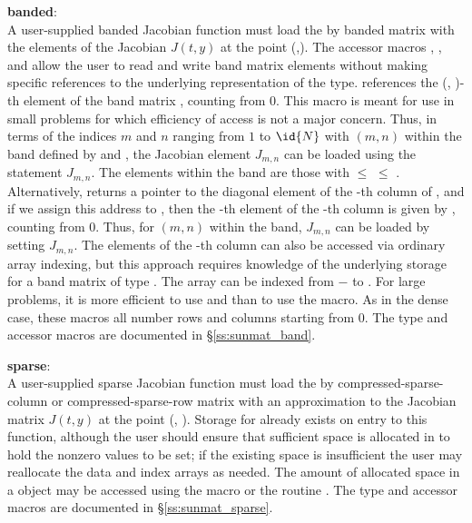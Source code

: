 {  {\bf banded}:\\
  A user-supplied banded Jacobian function must load the  by  banded matrix
   with the elements of the Jacobian $J(t,y)$ at the point
  (,).  The accessor macros ,
  , and  allow the user
  to read and write band matrix elements without making specific
  references to the underlying representation of the {\sunmatband}
  type.   references the (,
  )-th element of the band matrix , counting from $0$.
  This macro is meant for use in small problems for which efficiency
  of access is not a major concern.  Thus, in terms of the indices $m$
  and $n$ ranging from $1$ to $\id{N}$ with $(m,n)$ within the band defined
  by  and , the Jacobian element $J_{m,n}$ can
  be loaded using the statement 
  $J_{m,n}$. The elements within the band are those with 
  $\le$  $\le$ . Alternatively,
   returns a pointer to the diagonal element
  of the -th column of , and if we assign this address
  to , then the -th element of the
  -th column is given by
  , counting from $0$.  Thus,
  for $(m,n)$ within the band, $J_{m,n}$ can be loaded by setting
   $J_{m,n}$.  The
  elements of the -th column can also be accessed via ordinary
  array indexing, but this approach requires knowledge of the
  underlying storage for a band matrix of type {\sunmatband}.
  The array  can be indexed from $-$ to
  . For large problems, it is more efficient to use
   and  than to use the
   macro.  As in the dense case, these macros all
  number rows and columns starting from $0$.  The {\sunmatband} type
  and accessor macros are documented in \S\ref{ss:sunmat_band}.

  {\bf sparse}:\\
  A user-supplied sparse Jacobian function must load the  by 
  compressed-sparse-column or compressed-sparse-row matrix 
  with an approximation to the Jacobian matrix $J(t,y)$ at the point
  (, ).  Storage for  already exists on entry to
  this function, although the user should ensure that sufficient space
  is allocated in  to hold the nonzero values to be set; if
  the existing space is insufficient the user may reallocate the data
  and index arrays as needed.  The amount of allocated space in a
  {\sunmatsparse} object may be accessed using the macro
   or the routine .  The
  {\sunmatsparse} type and accessor macros are documented in
  \S\ref{ss:sunmat_sparse}.
}



